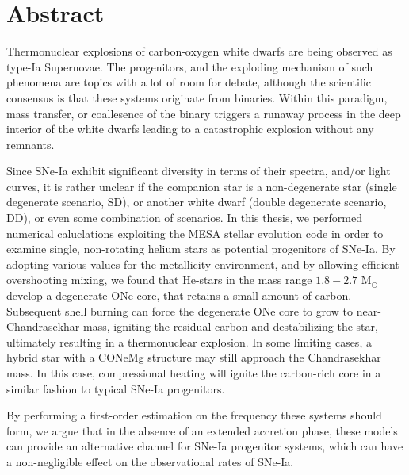 \documentclass[../main/thesis_msc.tex]{subfiles}
\begin{document}
\chapter*{Abstract}

Thermonuclear explosions of carbon-oxygen white dwarfs are being observed as type-Ia Supernovae. The progenitors, and the exploding mechanism of such phenomena are topics with a lot of room for debate, although the scientific consensus is that these systems originate from binaries. Within this paradigm, mass transfer, or coallesence of the binary triggers a runaway process in the deep interior of the white dwarfs leading to a catastrophic explosion without any remnants.

Since SNe-Ia exhibit significant diversity in terms of their spectra, and/or light curves, it is rather unclear if the companion star is a non-degenerate star (single degenerate scenario, SD), or another white dwarf (double degenerate scenario, DD), or even some combination of scenarios. In this thesis, we performed numerical caluclations exploiting the MESA stellar evolution code in order to examine single, non-rotating helium stars as potential progenitors of SNe-Ia. By adopting various values for the metallicity environment, and by allowing efficient overshooting mixing, we found that He-stars in the mass range $1.8-2.7$ M$_{\odot}$ develop a degenerate ONe core, that retains a small amount of carbon. Subsequent shell burning can force the degenerate ONe core to grow to near-Chandrasekhar mass, igniting the residual carbon and destabilizing the star, ultimately resulting in a thermonuclear explosion. In some limiting cases, a hybrid star with a CONeMg structure may still approach the Chandrasekhar mass. In this case, compressional heating will ignite the carbon-rich core in a similar fashion to typical SNe-Ia progenitors.

By performing a first-order estimation on the frequency these systems should form, we argue that in the absence of an extended accretion phase, these models can provide an alternative channel for SNe-Ia progenitor systems, which can have a non-negligible effect on the observational rates of SNe-Ia.
\end{document}
